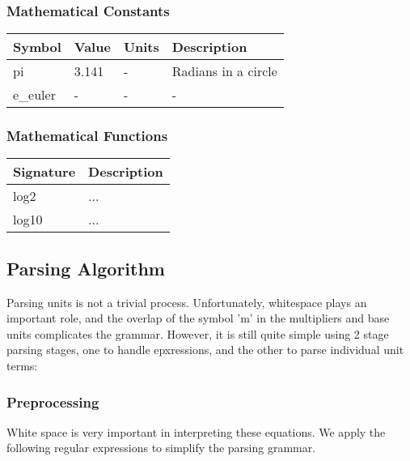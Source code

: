 \documentclass{article}
\begin{document}
\subsubsection{Mathematical Constants}
\begin{center}
    \begin{tabular}{ | l | l |  l | p{5cm} |}
    \hline
    Symbol & Value & Units & Description  \\ \hline
    pi & 3.141 & - & Radians in a circle \\ \hline
    e\_euler & - & - & - \\ \hline
    \end{tabular}
\end{center}

\subsubsection{Mathematical Functions}
\begin{center}
    \begin{tabular}{ | l |  p{5cm} |}
    \hline
    Signature &  Description  \\ \hline
    log2 & {...} \\ \hline
    log10 & {...} \\ \hline
    \end{tabular}
\end{center}

\newpage
\subsection{Parsing Algorithm}

Parsing units is not a trivial process. Unfortunately, whitespace plays an important role, and the overlap of the symbol 'm' in the multipliers and base units complicates the grammar. However, it is still quite simple using 2 stage parsing stages, one to handle epxressions, and the other to parse individual unit terms:


\subsubsection{Preprocessing}

White space is very important in interpreting these equations. We apply the following regular expressions to simplify the parsing grammar.
\end{document}
